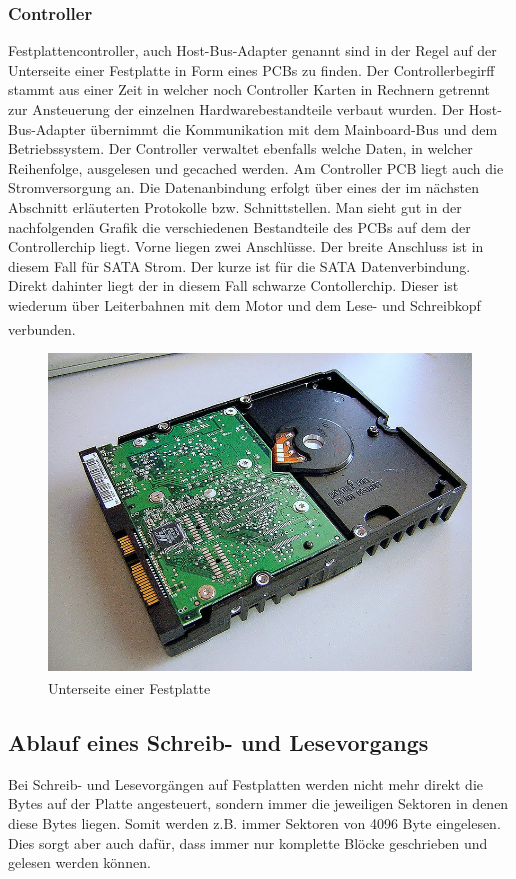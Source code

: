 \documentclass[a4paper, DIV20, 12pt, headsepline, parskip, flushleft]{scrartcl}
\begin{document}
\subsubsection{Controller}
Festplattencontroller, auch Host-Bus-Adapter genannt sind in der Regel auf der Unterseite einer Festplatte in Form eines PCBs zu finden. Der Controllerbegirff stammt aus einer Zeit in welcher noch Controller Karten in Rechnern getrennt zur Ansteuerung der einzelnen Hardwarebestandteile verbaut wurden. Der Host-Bus-Adapter übernimmt die Kommunikation mit dem Mainboard-Bus und dem Betriebssystem. Der Controller verwaltet ebenfalls welche Daten, in welcher Reihenfolge, ausgelesen und gecached werden. Am Controller PCB liegt auch die Stromversorgung an. Die Datenanbindung erfolgt über eines der im nächsten Abschnitt erläuterten Protokolle bzw. Schnittstellen.
Man sieht gut in der nachfolgenden Grafik die verschiedenen Bestandteile des PCBs auf dem der Controllerchip liegt.
Vorne liegen zwei Anschlüsse. Der breite Anschluss ist in diesem Fall für SATA Strom. Der kurze ist für die SATA Datenverbindung. Direkt dahinter liegt der in diesem Fall schwarze Contollerchip. Dieser ist wiederum über Leiterbahnen mit dem Motor und dem Lese- und Schreibkopf verbunden.\textsuperscript{\cite{ctrl}}
\begin{figure}[H]
\begin{center}
\includegraphics[scale=1]{FestplatteUnterseite.jpg}
\end{center}
\caption{Unterseite einer Festplatte \textsuperscript{\cite{img:hdddown}}}
\end{figure}
\subsection{Ablauf eines Schreib- und Lesevorgangs}
Bei Schreib- und Lesevorgängen auf Festplatten werden nicht mehr direkt die Bytes auf der Platte angesteuert, sondern immer die jeweiligen Sektoren in denen diese Bytes liegen. Somit werden z.B. immer Sektoren von 4096 Byte eingelesen. Dies sorgt aber auch dafür, dass immer nur komplette Blöcke geschrieben und gelesen werden können.
\end{document}
